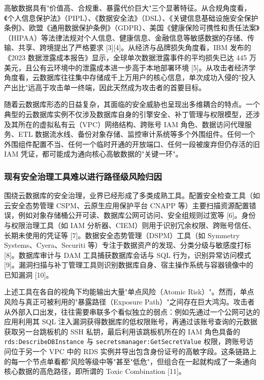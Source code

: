 \documentclass[a4paper,12pt]{ctexart}
\begin{document}
高敏数据具有"价值高、合规重、暴露代价巨大"三个显著特征。从合规角度看，《个人信息保护法》（PIPL）、《数据安全法》（DSL）、《关键信息基础设施安全保护条例》、欧盟《通用数据保护条例》（GDPR）、美国《健康保险可携性和责任法案》（HIPAA）等法律法规对个人信息、健康信息、金融信息等敏感数据的存储、传输、共享、跨境提出了严格要求 [3][4]。从经济与品牌损失角度看，IBM 发布的《2023 数据泄露成本报告》显示，全球单次数据泄露事件的平均损失已达 445 万美元，且公有云环境中的泄露成本进一步高于本地部署环境 [5]。从攻击者经济学角度看，云数据库往往集中存储成千上万用户的核心信息，单次成功入侵的"投入产出比"远高于攻击单一终端，因此天然成为攻击者的首要目标。

随着云数据库形态的日益复杂，其面临的安全威胁也呈现出多维耦合的特点。一个典型的云数据库实例不仅涉及数据库自身的引擎安全、补丁管理与权限模型，还涉及其所在的虚拟私有云（VPC）网络结构、跨账号 IAM 角色、数据访问代理服务、ETL 数据流水线、备份对象存储、监控审计系统等多个外围组件。任何一个外围组件配置不当、任何一个临时开通的开放端口、任何一段被废弃但仍存活的旧 IAM 凭证，都可能成为通向核心高敏数据的"关键一环"。

\subsubsection{现有安全治理工具难以进行路径级风险归因}

围绕云数据库的安全治理，业界已经形成了多类成熟工具。配置安全检查工具（如云安全态势管理 CSPM、云原生应用保护平台 CNAPP 等）主要扫描资源配置错误，例如对象存储桶公开可读、数据库公网可访问、安全组规则过宽等 [6]。身份与权限治理工具（如 IAM 分析器、CIEM）则用于识别冗余权限、跨账号信任、长期未使用的凭证等 [7]。数据安全态势管理（DSPM）工具（如 Symmetry Systems、Cyera、Securiti 等）专注于数据资产的发现、分类分级与敏感度打标 [8]。数据库审计与 DAM 工具捕获数据库会话与 SQL 行为，识别异常访问模式 [9]。漏洞扫描与补丁管理工具则识别数据库自身、宿主操作系统与容器镜像中的已知漏洞 [10]。

上述工具在各自的视角下均能输出大量"单点风险（Atomic Risk）"。然而，单点风险与真正可被利用的"暴露路径（Exposure Path）"之间存在巨大鸿沟。攻击者从外部入口出发，往往需要串联多个看似独立的弱点：例如先通过一个公网可达的应用利用其 SQL 注入漏洞获得数据库的低权限账号，再通过该账号查询的元数据获取另一台跳板机的 SSH 私钥，最后利用该跳板机所在的 IAM 角色具备的 \texttt{rds:DescribeDBInstance} 与 \texttt{secretsmanager:GetSecretValue} 权限，跨账号访问位于另一个 VPC 中的 RDS 实例并导出包含身份证号的高敏字段。这条链路上的每一个节点单看都"风险等级中等"甚至"低危"，但组合在一起就构成了一条通向核心数据的高危路径，即所谓的 Toxic Combination [11]。
\end{document}
